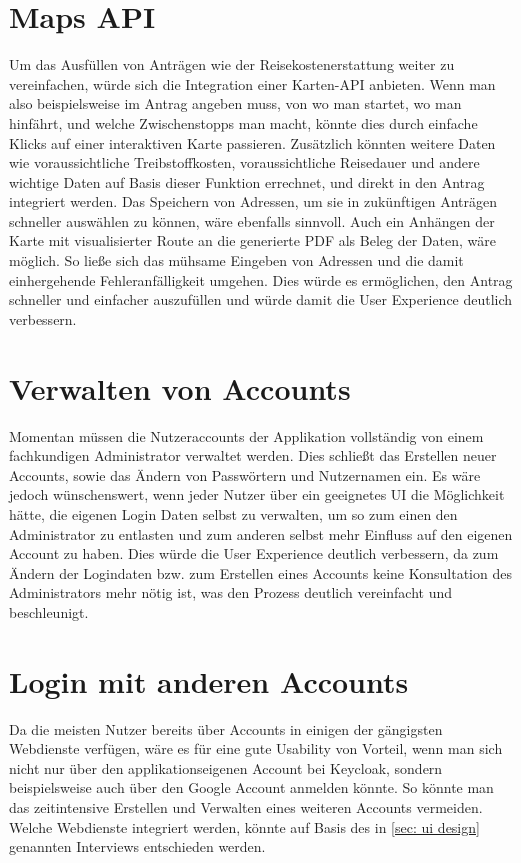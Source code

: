 \section{Maps \ac{API}}\label{sec: maps api}
Um das Ausfüllen von Anträgen wie der Reisekostenerstattung weiter zu vereinfachen, würde
sich die Integration einer Karten-\ac{API} anbieten. Wenn man also beispielsweise im
Antrag angeben muss, von wo man startet, wo man hinfährt, und welche Zwischenstopps man
macht, könnte dies durch einfache Klicks auf einer interaktiven Karte passieren. Zusätzlich
könnten weitere Daten wie voraussichtliche Treibstoffkosten, voraussichtliche Reisedauer
und andere wichtige Daten auf Basis dieser Funktion errechnet, und direkt in den Antrag
integriert werden. Das Speichern von Adressen, um sie in zukünftigen Anträgen schneller
auswählen zu können, wäre ebenfalls sinnvoll.
Auch ein Anhängen der Karte mit visualisierter Route an die generierte
PDF als Beleg der Daten, wäre möglich. So ließe sich das mühsame Eingeben von Adressen
und die damit einhergehende Fehleranfälligkeit umgehen. Dies würde es 
ermöglichen, den Antrag schneller und einfacher auszufüllen und würde damit die User
Experience deutlich verbessern.

\section{Verwalten von Accounts}\label{sec: verwalten von Accounts}
Momentan müssen die Nutzeraccounts der Applikation vollständig von einem fachkundigen
Administrator verwaltet werden. Dies schließt das Erstellen neuer Accounts, sowie das
Ändern von Passwörtern und Nutzernamen ein. Es wäre jedoch wünschenswert, wenn jeder
Nutzer über ein geeignetes \ac{UI} die Möglichkeit hätte, die eigenen Login Daten selbst
zu verwalten, um so zum einen den Administrator zu entlasten und zum anderen selbst mehr
Einfluss auf den eigenen Account zu haben. Dies würde die User Experience deutlich
verbessern, da zum Ändern der Logindaten bzw. zum Erstellen eines Accounts keine
Konsultation des Administrators mehr nötig ist, was den Prozess deutlich vereinfacht und
beschleunigt.

\section{Login mit anderen Accounts}\label{sec: login mit anderen Accounts}
Da die meisten Nutzer bereits über Accounts in einigen der gängigsten Webdienste verfügen,
wäre es für eine gute Usability von Vorteil, wenn man sich nicht nur über den
applikationseigenen Account bei Keycloak, sondern beispielsweise auch über den Google
Account anmelden könnte. So könnte man das zeitintensive Erstellen und Verwalten eines
weiteren Accounts vermeiden. Welche Webdienste integriert werden, könnte auf Basis des in
\ref{sec: ui design} genannten Interviews entschieden werden.

